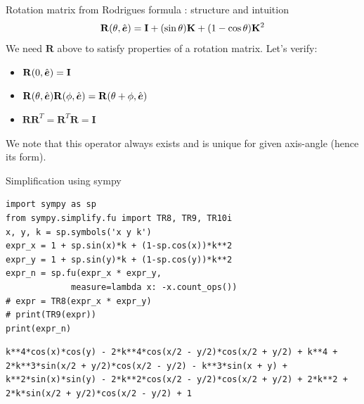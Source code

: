 \documentclass[presentation]{beamer}
\newcommand{\gv}[1]{\ensuremath{\mbox{\boldmath$ #1 $}}}
\newcommand{\bv}[1]{\ensuremath{\mathbf{#1}}}
\begin{document}
\begin{frame}[label={sec:orgabd1ff4}]{Rotation matrix from Rodrigues formula : structure and intuition}
 \[ \mathbf {R}(\theta, \hat{\gv{e}}) =\mathbf {I} +(\sin \theta )\mathbf {K} +(1-\cos \theta )\mathbf {K} ^{2} \]
We need \(\bv{R}\) above to satisfy properties of a rotation matrix. Let's verify:
\begin{itemize}
\item \(\bv{R}(0, \hat{\gv{e}}) = \bv{I}\)
\item \(\bv{R}(\theta, \hat{\gv{e}})\bv{R}(\phi, \hat{\gv{e}}) =
     \bv{R}(\theta+\phi, \hat{\gv{e}})\)
\item \(\bv{R}\bv{R}^T = \bv{R}^T\bv{R} = \bv{I}\)
\end{itemize}
We note that this operator always exists and is unique for given axis-angle
(hence its form).
\end{frame}
\begin{frame}[label={sec:org85515da},fragile]{Simplification using sympy}
 \begin{verbatim}
import sympy as sp
from sympy.simplify.fu import TR8, TR9, TR10i
x, y, k = sp.symbols('x y k')
expr_x = 1 + sp.sin(x)*k + (1-sp.cos(x))*k**2
expr_y = 1 + sp.sin(y)*k + (1-sp.cos(y))*k**2
expr_n = sp.fu(expr_x * expr_y,
             measure=lambda x: -x.count_ops())
# expr = TR8(expr_x * expr_y)
# print(TR9(expr))
print(expr_n)
\end{verbatim}

\begin{verbatim}
k**4*cos(x)*cos(y) - 2*k**4*cos(x/2 - y/2)*cos(x/2 + y/2) + k**4 + 2*k**3*sin(x/2 + y/2)*cos(x/2 - y/2) - k**3*sin(x + y) + k**2*sin(x)*sin(y) - 2*k**2*cos(x/2 - y/2)*cos(x/2 + y/2) + 2*k**2 + 2*k*sin(x/2 + y/2)*cos(x/2 - y/2) + 1
\end{verbatim}
\end{frame}
\end{document}
